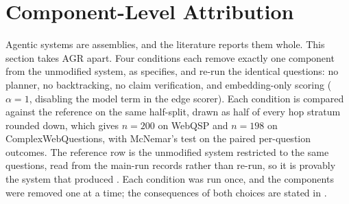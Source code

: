 %
%
%
%
%

\section{Component-Level Attribution}\label{sec:attribution}

Agentic systems are assemblies, and the literature reports them whole.
This section takes AGR apart. Four conditions each remove exactly one
component from the unmodified system, as  specifies,
and re-run the identical questions: no planner, no backtracking, no
claim verification, and embedding-only scoring ($\alpha = 1$, disabling
the model term in the edge scorer). Each condition is compared against
the reference on the same half-split, drawn as half of every hop stratum
rounded down, which gives $n = 200$ on WebQSP and $n = 198$ on
ComplexWebQuestions, with McNemar's test on the paired per-question
outcomes. The reference row is the unmodified system restricted to the
same questions, read from the main-run records rather than re-run, so it
is provably the system that produced . Each condition was
run once, and the components were removed one at a time; the
consequences of both choices are stated in .

